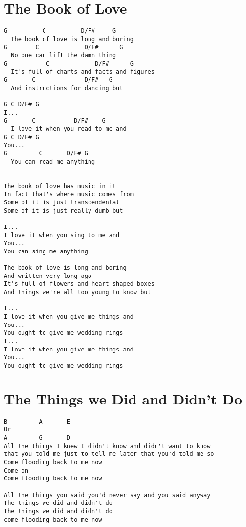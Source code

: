 \documentclass[leqno]{memoir}
\begin{document}
\chapter{The Book of Love}
\begin{verbatim}
G          C          D/F#     G
  The book of love is long and boring
G        C             D/F#      G    
  No one can lift the damn thing 
G           C             D/F#      G
  It's full of charts and facts and figures
G       C              D/F#   G
  And instructions for dancing but

G C D/F# G
I...
G       C           D/F#    G
  I love it when you read to me and
G C D/F# G
You...
G         C       D/F# G
  You can read me anything


The book of love has music in it
In fact that's where music comes from
Some of it is just transcendental
Some of it is just really dumb but

I...
I love it when you sing to me and
You...
You can sing me anything

The book of love is long and boring
And written very long ago
It's full of flowers and heart-shaped boxes
And things we're all too young to know but

I...
I love it when you give me things and
You...
You ought to give me wedding rings
I...
I love it when you give me things and
You...
You ought to give me wedding rings
\end{verbatim}
\newpage

\chapter{The Things we Did and Didn't Do}
\begin{verbatim}
B         A       E
Or
A         G       D
All the things I knew I didn't know and didn't want to know
that you told me just to tell me later that you'd told me so
Come flooding back to me now
Come on
Come flooding back to me now

All the things you said you'd never say and you said anyway
The things we did and didn't do
The things we did and didn't do
come flooding back to me now 
\end{verbatim}
\newpage
\end{document}
